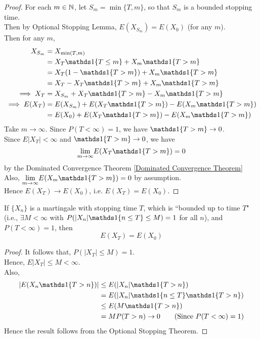 \documentclass[11pt]{article}
\renewcommand{\limit}[1]{\underset{{#1} \rightarrow \infty}{\lim}}
\begin{document}
    \begin{proof}
    	For each $m \in \mathbb{N}$, let $S_m = \min\{T, m\}$, so that $S_m$ is a bounded stopping time. \\
    	Then by Optional Stopping Lemma, $E(X_{S_m}) = E(X_0)$ (for any $m$). \\
    	Then for any $m$,
    	\begin{align*}
    		X_{S_m} &= X_{\min(T,m)} \\
    		&= X_T\id{T\leq m} + X_m\id{T>m} \\
    		&= X_T(1 - \id{T>m}) + X_m\id{T>m} \\
    		&= X_T - X_T\id{T>m} + X_m\id{T>m} \\
    		\implies X_T &= X_{S_m} + X_T\id{T>m} - X_m\id{T>m} \\
    		\implies E(X_T) &= E(X_{S_m}) + E(X_T\id{T>m}) - E(X_m\id{T>m}) \\
    		&= E(X_0) + E(X_T\id{T>m}) - E(X_m\id{T>m})
    	\end{align*}
    	Take $m\rightarrow \infty$. Since $P(T<\infty) = 1$, we have $\id{T>m} \rightarrow 0$.\\
    	Since $E|X_T| < \infty$ and $\id{T>m} \rightarrow 0$, we have
    	$$\limit{m} E(X_T\id{T>m}) = 0$$
    	by the Dominated Convergence Theorem \ref{Dominated Convergence Theorem} \\
    	Also, $\limit{m}E(X_m\id{T>m}) = 0$ by assumption.\\ 
    	Hence $E(X_T) \rightarrow E(X_0)$, i.e. $E(X_T) = E(X_0)$.
    \end{proof}
     If $\{X_n\}$ is a martingale with stopping time $T$, which is ``bounded up to time $T$" (i.e., $\exists M < \infty$ with $P(|X_n|\id{n\leq T} \leq M) = 1$ for all $n$), and $P(T<\infty) = 1$, then 
    $$E(X_T) = E(X_0)$$
    \begin{proof}
    	It follows that, $P(|X_T| \leq M) = 1$.\\
    	Hence, $E|X_T| \leq M < \infty$.\\
    	Also, 
    	\begin{align*}
    		|E(X_n\id{T>n})| &\leq E(|X_n|\id{T>n})\\
    		&= E(|X_n|\id{n\leq T}\id{T>n})\\
    		&\leq E(M\id{T>n}) \\
    		&= MP(T>n) \rightarrow 0 \tag{Since $P(T<\infty) = 1$}
    	\end{align*}
    	Hence the result follows from the Optional Stopping Theorem.
    \end{proof}
    
\end{document}
